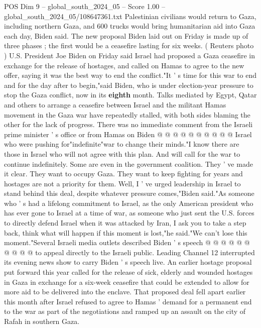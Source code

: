 \begin{textsample}{POS Dim 9 – global\_south\_2024\_05 – Score 1.00 – global\_south\_2024\_05/108647361.txt}  \label{ex:f9_pos_124}
Palestinian civilians would return to Gaza, including northern Gaza, and 600 trucks would bring humanitarian aid into Gaza each day, Biden said.
The new proposal Biden laid out on Friday is made up of three phases ; the first would be a ceasefire lasting for six weeks. ( Reuters photo ) U.S.
President Joe Biden on Friday said Israel had proposed a Gaza ceasefire in exchange for the release of hostages, and called on Hamas to agree to the new offer, saying it was the best way to end the conflict."It ' s time for this war to end and for the day after to begin,"said Biden, who is under election-year pressure to stop the Gaza conflict, now in its \textbf{eighth} month.
Talks mediated by Egypt, Qatar and others to arrange a ceasefire between Israel and the militant Hamas movement in the Gaza war have repeatedly stalled, with both sides blaming the other for the lack of progress.
There was no immediate comment from the Israeli prime minister ' s office or from Hamas on Biden @ @ @ @ @ @ @ @ @ @ Israel who were pushing for"indefinite"war to change their minds."I know there are those in Israel who will not agree with this plan.
And will call for the war to continue indefinitely.
Some are even in the government coalition.
They ' ve made it clear.
They want to occupy Gaza.
They want to keep fighting for years and hostages are not a priority for them.
Well, I ' ve urged leadership in Israel to stand behind this deal, despite whatever pressure comes,"Biden said."As someone who ' s had a lifelong commitment to Israel, as the only American president who has ever gone to Israel at a time of war, as someone who just sent the U.S. forces to directly defend Israel when it was attacked by Iran, I ask you to take a step back, think what will happen if this moment is lost,"he said."We can't lose this moment."Several Israeli media outlets described Biden ' s speech @ @ @ @ @ @ @ @ @ @ to appeal directly to the Israeli public.
Leading Channel 12 interrupted its evening news show to carry Biden ' s speech live.
An earlier hostage proposal put forward this year called for the release of sick, elderly and wounded hostages in Gaza in exchange for a six-week ceasefire that could be extended to allow for more aid to be delivered into the enclave.
That proposed deal fell apart earlier this month after Israel refused to agree to Hamas ' demand for a permanent end to the war as part of the negotiations and ramped up an assault on the city of Rafah in southern Gaza.

\end{textsample}

